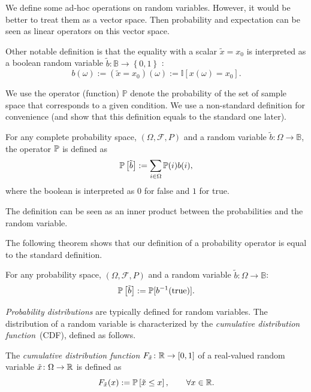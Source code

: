 

\begin{remark}
We define some ad-hoc operations on random variables. However, it would be better to treat them as a vector space. Then probability and expectation can be seen as linear operators on this vector space. 

Other notable definition is that the equality with a scalar $\tilde{x} = x_0$ is interpreted as a boolean random variable $\tilde{b}: \mathbb{B} \to \left\{ 0,1 \right\}$ :
\[
  b(\omega) := (\tilde{x} = x_0)(\omega) := \mathbb{I}[ x(\omega) = x_0].
\]

\end{remark}

We use the operator (function) $\mathbb{P}$ denote the probability of the set of sample space that corresponds to a given condition. We use a non-standard definition for convenience (and show that this definition equals to the standard one later).
\begin{definition}
For any complete probability space, $(\Omega, \mathcal{F}, P)$ and a random variable $\tilde{b}\colon \Omega \to \mathbb{B}$, the operator $\mathbb{P}$ is defined as
\[
\mathbb{P}\left[ \tilde{b} \right] := \sum_{i\in \Omega} \mathbb{P}(i) b(i),
\]
where the boolean is interpreted as $0$ for false and $1$ for true. 
\end{definition}
The definition can be seen as an inner product between the probabilities and the random variable. 

The following theorem shows that our definition of a probability operator is equal to the standard definition.
\begin{theorem}
  For any probability space, $(\Omega, \mathcal{F}, P)$ and a random variable $\tilde{b}\colon \Omega \to \mathbb{B}$: 
  \[
   \mathbb{P}\left[\tilde{b} \right] := \mathbb{P}[b^{-1}(\operatorname{true})]. 
 \]
\end{theorem}

\emph{Probability distributions} are typically defined for random variables. The distribution of a random variable is characterized by the \emph{cumulative distribution function}~(CDF), defined as follows.
\begin{definition}[CDF]
  The \emph{cumulative distribution function} $F_{\tilde{x}}\colon \mathbb{R} \to [0,1]$ of a real-valued random variable $\tilde{x}\colon \Omega \to \mathbb{R}$ is defined as
  \[
   F_{\tilde{x}}(x) := \mathbb{P}\left[\tilde{x} \le x\right], \qquad \forall x\in \mathbb{R}. 
  \]
\end{definition}


